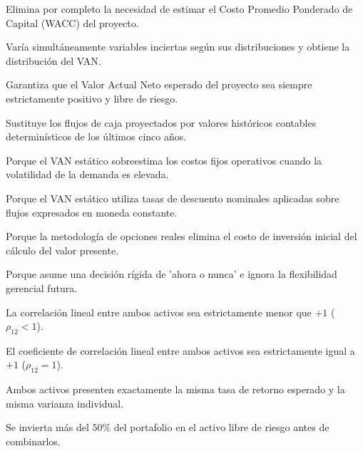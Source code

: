 \begin{opts}
    \item Elimina por completo la necesidad de estimar el Costo Promedio Ponderado de Capital (WACC) del proyecto.
    \item Varía simultáneamente variables inciertas según sus distribuciones y obtiene la distribución del VAN.
    \item Garantiza que el Valor Actual Neto esperado del proyecto sea siempre estrictamente positivo y libre de riesgo.
    \item Sustituye los flujos de caja proyectados por valores históricos contables determinísticos de los últimos cinco años.
\end{opts}

\begin{opts}
    \item Porque el VAN estático sobreestima los costos fijos operativos cuando la volatilidad de la demanda es elevada.
    \item Porque el VAN estático utiliza tasas de descuento nominales aplicadas sobre flujos expresados en moneda constante.
    \item Porque la metodología de opciones reales elimina el costo de inversión inicial del cálculo del valor presente.
    \item Porque asume una decisión rígida de 'ahora o nunca' e ignora la flexibilidad gerencial futura.
\end{opts}

\begin{opts}
    \item La correlación lineal entre ambos activos sea estrictamente menor que $+1$ ($\rho_{12} < 1$).
    \item El coeficiente de correlación lineal entre ambos activos sea estrictamente igual a $+1$ ($\rho_{12} = 1$).
    \item Ambos activos presenten exactamente la misma tasa de retorno esperado y la misma varianza individual.
    \item Se invierta más del $50\%$ del portafolio en el activo libre de riesgo antes de combinarlos.
\end{opts}

